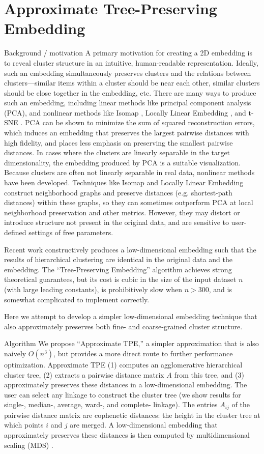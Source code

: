 \documentclass{article}
\begin{document}
\section{Approximate Tree-Preserving Embedding}
Background / motivation
A primary motivation for creating a 2D embedding is to reveal cluster structure in an intuitive, human-readable representation. Ideally, such an embedding simultaneously preserves clusters and the relations between clusters---similar items within a cluster should be near each other, similar clusters should be close together in the embedding, etc. There are many ways to produce such an embedding, including linear methods like principal component analysis (PCA), and nonlinear methods like Isomap \cite{}, Locally Linear Embedding \cite{}, and t-SNE \cite{}. PCA can be shown to minimize the sum of squared reconstruction errors, which induces an embedding that preserves the largest pairwise distances with high fidelity, and places less emphasis on preserving the smallest pairwise distances. In cases where the clusters are linearly separable in the target dimensionality, the embedding produced by PCA is a suitable visualization. Because clusters are often not linearly separable in real data, nonlinear methods have been developed. Techniques like Isomap and Locally Linear Embedding construct neighborhood graphs and preserve distances (e.g. shortest-path distances) within these graphs, so they can sometimes outperform PCA at local neighborhood preservation and other metrics. However, they may distort or introduce structure not present in the original data, and are sensitive to user-defined settings of free parameters.

Recent work \cite{tpe} constructively produces a low-dimensional embedding such that the results of hierarchical clustering are identical in the original data and the embedding. The “Tree-Preserving Embedding” algorithm achieves strong theoretical guarantees, but its cost is cubic in the size of the input dataset $n$ (with large leading constants), is prohibitively slow when $n > 300$, and is somewhat complicated to implement correctly.

Here we attempt to develop a simpler low-dimensional embedding technique that also approximately preserves both fine- and coarse-grained cluster structure.

Algorithm
We propose “Approximate TPE,” a simpler approximation that is also naively $O(n^3)$, but provides a more direct route to further performance optimization. Approximate TPE (1) computes an agglomerative hierarchical cluster tree, (2) extracts a pairwise distance matrix $A$ from this tree, and (3) approximately preserves these distances in a low-dimensional embedding. The user can select any linkage to construct the cluster tree (we show results for single-, median-, average, ward-, and complete- linkage). The entries $A_{ij}$ of the pairwise distance matrix are cophenetic distances: the height in the cluster tree at which points $i$ and $j$ are merged. A low-dimensional embedding that approximately preserves these distances is then computed by multidimensional scaling (MDS) \cite{}.
\end{document}
